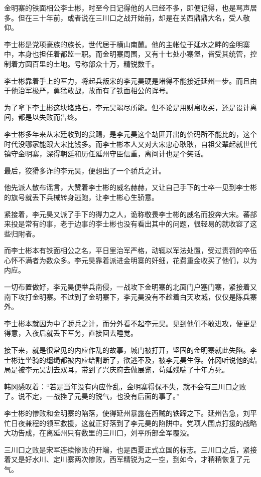金明寨的铁面相公李士彬，时至今日记得他的人已经不多，即便记得，也是骂声居多。但在三十年前，或者说在三川口之战开始前，却是在关西鼎鼎大名，受人敬仰。

李士彬是党项豪族的族长，世代居于横山南麓。他的主帐位于延水之畔的金明寨中，本身也担任着都监一职。而金明寨周围，又有十七处小寨堡，皆受其统管，控制着方圆百里的土地。号称部众十万，精锐数千。

李士彬靠着手上的军力，将起兵叛宋的李元昊硬是堵得不能接近延州一步。而且由于他治军极严，勇猛敢战，故而有了铁面相公的诨号。

为了拿下李士彬这块堵路石，李元昊竭尽所能。但不论是用财帛收买，还是设计离间，都是以失败而告终。

李士彬多年来从宋廷收到的赏赐，是李元昊这个劫匪开出的价码所不能比的，这个时代没哪家能跟大宋比钱多。而李士彬本人又对大宋忠心耿耿，自祖父辈起就世代镇守金明寨，深得朝廷和历任延州守臣信重，离间计也是个笑话。

最后，狡猾多诈的李元昊，便想出了一个骄兵之计。

他先派人散布谣言，大赞着李士彬的威名赫赫，又让自己手下的士卒一见到李士彬的旗号就丢下兵械转身逃跑，让李士彬心生骄意。

紧接着，李元昊又派了手下的得力之人，诡称敬畏李士彬的威名而投奔大宋。蕃部来投是常有的事，老于边事的李士彬也没有看出其中的问题，很轻易的就收容了这些归附者。

而李士彬本有铁面相公之名，平日里治军严格，动辄以军法处置，受过责罚的卒伍心怀不满者为数众多。李元昊靠着派进金明寨的奸细，花费重金收买了他们，以为内应。

一切布置做好，李元昊便举兵南侵，一战攻下金明寨的北面门户塞门寨，紧接着又南下攻打金明寨。不过到了金明寨下，李元昊没有不趁着白天攻城，仅仅是陈兵寨外。

李士彬本就因为中了骄兵之计，而分外看不起李元昊。见到他们不敢进攻，便更是得意，入夜后就丢下军务，直接回去睡觉。

接下来，就是很常见的内应作乱的故事，城门被打开，坚固的金明寨就此失陷。李士彬连坐骑的缰绳都被内应给割断了，欲逃不及，被李元昊生俘。韩冈听说他的结局是被李元昊割去双耳，带到了兴庆府去做展览，苟延残喘了十年方死。

韩冈感叹着：“若是当年没有内应作乱，金明寨得保不失，就不会有三川口之败了。说不定，一战挫了元昊的锐气，也没有后面的事了。”

李士彬的惨败和金明寨的陷落，使得延州暴露在西贼的铁蹄之下。延州告急，刘平忙日夜兼程的领军救援，这就正好落到了李元昊的陷阱中。党项人围点打援的战略大功告成，在离延州只有数里的三川口，刘平所部全军覆没。

三川口之败是宋军连续惨败的开端，也是西夏正式立国的标志。三川口之后，紧接着又是好水川、定川寨两次惨败，西军精锐为之一空，到如今，才稍稍恢复了元气。

